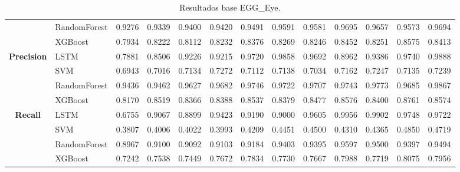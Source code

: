 \begin{table}[h]
\begin{adjustbox}{max width=15cm}
\begin{tabular}{|c|l|r|r|r|r|r|r|r|r|r|r|r|}
			& RandomForest &  0.9276 &  0.9339 &  0.9400 &  0.9420 &  0.9491 &  0.9591 &  0.9581 &  0.9695 &  0.9657 &  0.9573 &  0.9694 \\
			& XGBoost &  0.7934 &  0.8222 &  0.8112 &  0.8232 &  0.8376 &  0.8269 &  0.8246 &  0.8452 &  0.8251 &  0.8575 &  0.8413 \\
			\hline
			\textbf{Precision} & LSTM &  0.7881 &  0.8506 &  0.9226 &  0.9215 &  0.9720 &  0.9858 &  0.9692 &  0.8962 &  0.9386 &  0.9740 &  0.9888 \\
			& SVM &  0.6943 &  0.7016 &  0.7134 &  0.7272 &  0.7112 &  0.7138 &  0.7034 &  0.7162 &  0.7247 &  0.7135 &  0.7239 \\
			& RandomForest &  0.9436 &  0.9462 &  0.9627 &  0.9682 &  0.9746 &  0.9722 &  0.9707 &  0.9743 &  0.9773 &  0.9685 &  0.9867 \\
			& XGBoost &  0.8170 &  0.8519 &  0.8366 &  0.8388 &  0.8537 &  0.8379 &  0.8477 &  0.8576 &  0.8400 &  0.8761 &  0.8574 \\
			\hline
			\textbf{Recall} & LSTM &  0.6755 &  0.9067 &  0.8899 &  0.9423 &  0.9190 &  0.9000 &  0.9605 &  0.9956 &  0.9902 &  0.9748 &  0.9722 \\
			& SVM &  0.3807 &  0.4006 &  0.4022 &  0.3993 &  0.4209 &  0.4451 &  0.4500 &  0.4310 &  0.4365 &  0.4850 &  0.4719 \\
			& RandomForest &  0.8967 &  0.9100 &  0.9092 &  0.9103 &  0.9184 &  0.9403 &  0.9395 &  0.9597 &  0.9500 &  0.9397 &  0.9494 \\
			& XGBoost &  0.7242 &  0.7538 &  0.7449 &  0.7672 &  0.7834 &  0.7730 &  0.7667 &  0.7988 &  0.7719 &  0.8075 &  0.7956 \\
			\hline
		\end{tabular}
	\end{adjustbox}
	\label{tab:EGGEyebase}
	\caption{Resultados base EGG\_Eye.}
\end{table}
